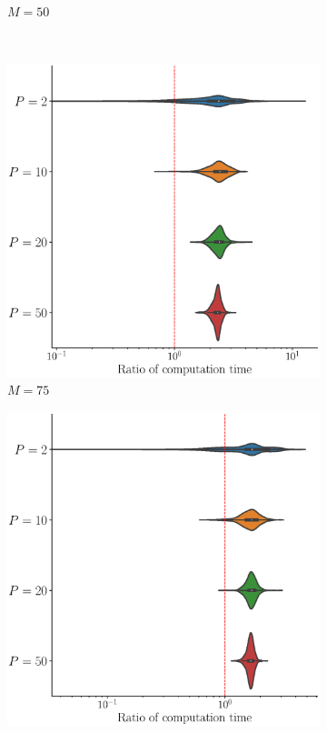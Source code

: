 \begin{results}
\begin{figure}
\begin{subfigure}[b]{0.49\textwidth}
         \caption{$M = 50$}
         \label{fig:computation_time_mfd_1d_50}
     \end{subfigure}
     \\
     \begin{subfigure}[b]{0.49\textwidth}
         \centering
         \includegraphics[width=\textwidth]{figures/scenario_1/computation_time_N50_M75.eps}
         \caption{$M = 75$}
         \label{fig:computation_time_mfd_1d_75}
     \end{subfigure}
     \begin{subfigure}[b]{0.49\textwidth}
         \centering
         \includegraphics[width=\textwidth]{figures/scenario_1/computation_time_N50_M100.eps}

\end{subfigure}
\end{figure}
\end{results}
